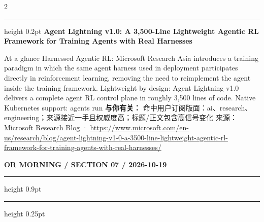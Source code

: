 \documentclass[10.5pt]{ctexart}
\begin{document}
\begin{multicols}{2}
\vspace{2mm}
\hrule height 0.2pt
\vspace{2mm}
{\large\bfseries Agent Lightning v1.0: A 3,500-Line Lightweight Agentic RL Framework for Training Agents with Real Harnesses}\par
At a glance Harnessed Agentic RL: Microsoft Research Asia introduces a training paradigm in which the same agent harness used in deployment participates directly in reinforcement learning, removing the need to reimplement the agent inside the training framework. Lightweight by design: Agent Lightning v1.0 delivers a complete agent RL control plane in roughly 3,500 lines of code. Native Kubernetes support: agents run 
\textbf{与你有关：} 命中用户订阅版面：ai、research、engineering；来源接近一手且权威度高；标题/正文包含高信号变化
{\footnotesize\color{ormuted} 来源：Microsoft Research Blog · \url{https://www.microsoft.com/en-us/research/blog/agent-lightning-v1-0-a-3500-line-lightweight-agentic-rl-framework-for-training-agents-with-real-harnesses/}}
\end{multicols}
\newpage
{\small\bfseries OR MORNING / SECTION 07 / 2026-10-19}
\vspace{2mm}
\hrule height 0.9pt
\vspace{1.5mm}
\hrule height 0.25pt
\vspace{4mm}
\end{document}
